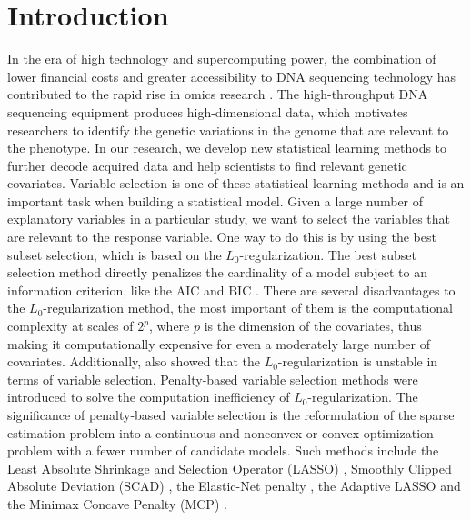 \documentclass[11pt]{article}
\begin{document}
\section{Introduction}
In the era of high technology and supercomputing power, the combination of lower financial costs and greater accessibility to DNA sequencing technology has contributed to the rapid rise in omics research \citep{mardis2011decade}. The high-throughput DNA sequencing equipment produces high-dimensional data, which motivates researchers to identify the genetic variations in the genome that are relevant to the phenotype. In our research, we develop new statistical learning methods to further decode acquired data and help scientists to find relevant genetic covariates.  Variable selection is one of these statistical learning methods and is an important task when building a statistical model. Given a large number of explanatory variables in a particular study, we want to select the variables that are relevant to the response variable. One way to do this is by using the best subset selection, which is based on the $L_0$-regularization. The best subset selection method directly penalizes the cardinality of a model subject to an information criterion, like the AIC \citep{akaike1974new} and BIC \citep{schwarz1978estimating}. There are several disadvantages to the $L_0$-regularization method, the most important of them is the computational complexity at scales of $2^p$, where $p$ is the dimension of the covariates, thus making it computationally expensive for even a moderately large number of covariates. Additionally, \citet{breiman1996heuristics} also showed that the $L_0$-regularization is unstable in terms of variable selection. Penalty-based variable selection methods were introduced to solve the computation inefficiency of $L_0$-regularization. The significance of penalty-based variable selection is the reformulation of the sparse estimation problem into a continuous and nonconvex or convex optimization problem with a fewer number of candidate models. Such methods include the Least Absolute Shrinkage and Selection Operator (LASSO) \citep{tibshirani1996regression}, Smoothly Clipped Absolute Deviation (SCAD) \citep{fan2001variable}, the Elastic-Net penalty \citep{zou2005regularization}, the Adaptive LASSO \citep{zou2006adaptive} and the Minimax Concave Penalty (MCP) \citep{zhang2010nearly}. 
\end{document}
